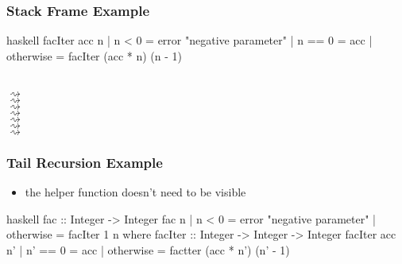 \documentclass[dvipsnames]{beamer}
\theoremstyle{plain}
\begin{document}
\begin{frame}[fragile]
  \frametitle{Stack Frame Example}

  \begin{exampleblock}{}
    \begin{pygments}{haskell}
facIter acc n
  | n < 0     = error "negative parameter"
  | n == 0    = acc
  | otherwise = facIter (acc * n) (n - 1)
    \end{pygments}

    \\
    $\rightsquigarrow$ \\
    \hspace{16pt}$\rightsquigarrow$ \\
    \hspace{16pt}$\rightsquigarrow$ \\
    \hspace{16pt}$\rightsquigarrow$ \\
    \hspace{16pt}$\rightsquigarrow$ \\
    \hspace{16pt}$\rightsquigarrow$ \\
    $\rightsquigarrow$ \\
  \end{exampleblock}
\end{frame}

\begin{frame}[fragile]
  \frametitle{Tail Recursion Example}

  \begin{itemize}
    \item the helper function doesn't need to be visible
  \end{itemize}

  \begin{exampleblock}{}
    \begin{pygments}{haskell}
fac :: Integer -> Integer
fac n
  | n < 0     = error "negative parameter"
  | otherwise = facIter 1 n
      where
        facIter :: Integer -> Integer -> Integer
        facIter acc n'
          | n' == 0   = acc
          | otherwise = factter (acc * n') (n' - 1)
    \end{pygments}
  \end{exampleblock}
\end{frame}
\end{document}
